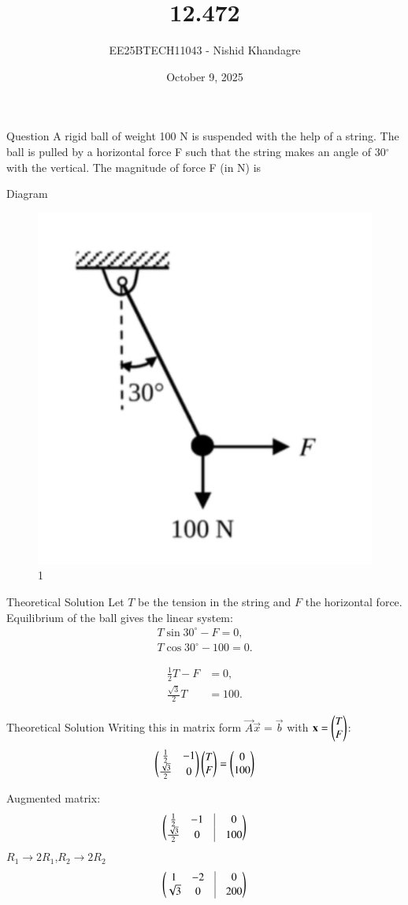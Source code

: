 \documentclass{beamer}
\title
{12.472}
\date{October 9, 2025}
\author
{EE25BTECH11043 - Nishid Khandagre}
\begin{document}
\frame{\titlepage}

\begin{frame}{Question}
A rigid ball of weight 100 N is suspended with the help of a string. The ball is pulled by a horizontal force F such that the string makes an angle of 30$^\circ$ with the vertical. The magnitude of force F (in N) is
\end{frame}

\begin{frame}{Diagram}
\begin{figure}[H]
\centering
\includegraphics[width=0.4\columnwidth]{figs/fig.jpg}
\caption{1}
\label{fig:fig}
\end{figure}
\end{frame}

\begin{frame}{Theoretical Solution}
Let $T$ be the tension in the string and $F$ the horizontal force.
Equilibrium of the ball gives the linear system:
\begin{align}
T\sin 30^\circ - F = 0, \\
T\cos 30^\circ - 100 = 0.
\end{align}

\begin{align}
\frac{1}{2}T - F &= 0, \\
\frac{\sqrt3}{2}T &= 100.
\end{align}
\end{frame}

\begin{frame}{Theoretical Solution}
Writing this in matrix form $\vec{A}\vec{x}=\vec{b}$ with $\mathbf{x}=\begin{pmatrix}T \\ F\end{pmatrix}$:
\begin{align}
\begin{pmatrix}
\frac12 & -1 \\
\frac{\sqrt3}{2} & 0
\end{pmatrix}
\begin{pmatrix}T \\ F\end{pmatrix}
=
\begin{pmatrix}0 \\ 100\end{pmatrix}
\end{align}

Augmented matrix:
\begin{align}
\myvec{
\frac12 & -1 & \vrule & 0 \\
\frac{\sqrt3}{2} & 0 & \vrule & 100
}
\end{align}
$R_1 \rightarrow 2R_1$,$R_2 \rightarrow 2R_2$
\begin{align}
\myvec{
1 & -2 & \vrule & 0 \\
\sqrt3 & 0 & \vrule & 200
}
\end{align}
\end{frame}
\end{document}
